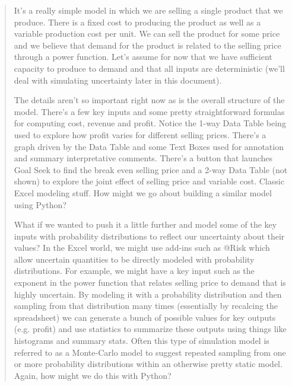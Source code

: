 \documentclass[ited,blindrev]{informs3}              %
\begin{document}
\begin{tcolorbox}
\begin{quotation}
\textsf{	
	It's a really simple model in which we are selling a single product that we produce. There is a fixed cost to producing the product as well as a variable production cost per unit. We can sell the product for some price and we believe that demand for the product is related to the selling price through a power function. Let's assume for now that we have sufficient capacity to produce to demand and that all inputs are deterministic (we'll deal with simulating uncertainty later in this document).}
	
	\textsf{The details aren't so important right now as is the overall structure of the model. There's a few key inputs and some pretty straightforward formulas for computing cost, revenue and profit. Notice the 1-way Data Table being used to explore how profit varies for different selling prices. There's a graph driven by the Data Table and some Text Boxes used for annotation and summary interpretative comments. There's a button that launches Goal Seek to find the break even selling price and a 2-way Data Table (not shown) to explore the joint effect of selling price and variable cost. Classic Excel modeling stuff. How might we go about building a similar model using Python? } 
	
	\textsf{What if we wanted to push it a little further and model some of the key inputs with probability distributions to reflect our uncertainty about their values? In the Excel world, we might use add-ins such as @Risk which allow uncertain quantities to be directly modeled with probability distributions. For example, we might have a key input such as the exponent in the power function that relates selling price to demand that is highly uncertain. By modeling it with a probability distribution and then sampling from that distribution many times (essentially by recalcing the spreadsheet) we can generate a bunch of possible values for key outputs (e.g. profit) and use statistics to summarize these outputs using things like histograms and summary stats. Often this type of simulation model is referred to as a Monte-Carlo model to suggest repeated sampling from one or more probability distributions within an otherwise pretty static model. Again, how might we do this with Python?}
\end{quotation}
\end{tcolorbox}
\end{document}
